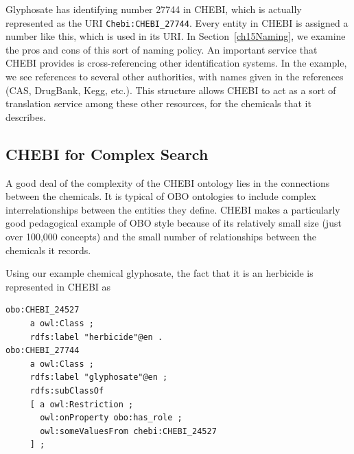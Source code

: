 Glyphosate has identifying number 27744 in CHEBI, which is actually
represented as the URI \texttt{Chebi:CHEBI\_27744}. Every entity in CHEBI is
assigned a number like this, which is used in its URI.  In Section~\ref{ch15Naming}, we
examine the pros and cons of this sort of naming policy. 
An important service that CHEBI provides is cross-referencing other identification
systems.  
In the example, we see references to several other
authorities, with names given in the references (CAS, DrugBank, Kegg,
etc.). This structure allows CHEBI to act as a sort of
translation service among these other resources, for the chemicals that
it describes.


\subsection{CHEBI for Complex Search}

A good deal of the complexity of the CHEBI ontology lies in the
connections between the chemicals. It is typical of OBO ontologies to
include complex interrelationships between the entities they define.
CHEBI makes a particularly good pedagogical example of OBO style because
of its relatively small size (just over 100,000 concepts) and the small number
of relationships between the chemicals it records.

Using our example chemical glyphosate, the fact that it is an herbicide
is represented in CHEBI as

\begin{lstlisting}
obo:CHEBI_24527
     a owl:Class ;
     rdfs:label "herbicide"@en .
obo:CHEBI_27744
     a owl:Class ;
     rdfs:label "glyphosate"@en ;
     rdfs:subClassOf
     [ a owl:Restriction ;
       owl:onProperty obo:has_role ;
       owl:someValuesFrom chebi:CHEBI_24527
     ] ;
\end{lstlisting}


